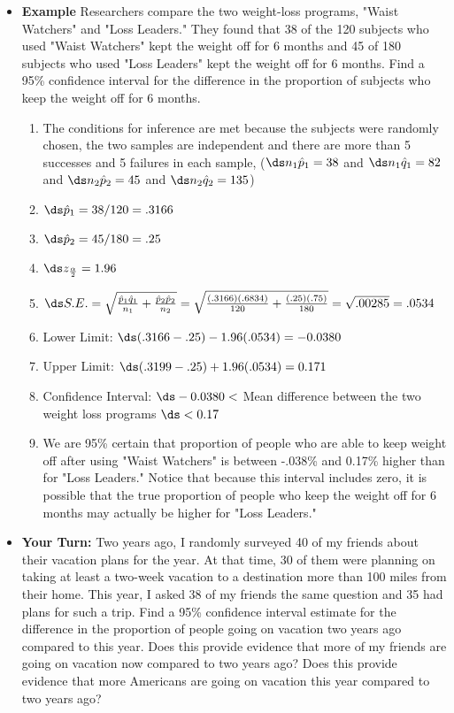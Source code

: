 \begin{itemize}
\item {\bf Example} Researchers compare the two weight-loss programs, "Waist Watchers" and "Loss Leaders."  They found that 38 of the 120 subjects who used "Waist Watchers" kept the weight off for 6 months and 45 of 180 subjects who used "Loss Leaders" kept the weight off for 6 months.  Find a 95\% confidence interval for the difference in the proportion of subjects who keep the weight off for 6 months.
\begin{enumerate}
\item The conditions for inference are met because the subjects were randomly chosen, the two samples are independent and there are more than 5 successes and 5 failures in each sample, ($\ds n_1\hat{p}_1=38$ and $\ds n_1\hat{q}_1=82$ and $\ds n_2\hat{p}_2=45$ and $\ds n_2 \hat{q}_2=135$)
\item $\ds \hat{p}_1=38/120 = .3166$
\item $\ds \hat{p}_2=45/180 = .25$
\item $\ds z_{\frac{\alpha}{2}}=1.96$
\item $\ds S.E.=\sqrt{\frac{\hat{p}_1\hat{q}_1}{n_1}+\frac{\hat{p}_2\hat{p}_2}{n_2}}=\sqrt{\frac{(.3166)(.6834)}{120}+\frac{(.25)(.75)}{180}}=\sqrt{.00285}=.0534$
\item Lower Limit:  $\ds (.3166-.25) - 1.96(.0534)=-0.0380$
\item Upper Limit: $\ds (.3199-.25) + 1.96(.0534)=0.171$
\item Confidence Interval:  $\ds -0.0380 <$ Mean difference between the two weight loss programs $\ds
 <0.17$
\item We are 95\% certain that proportion of people who are able to keep weight off after using "Waist Watchers" is between -.038\% and 0.17\% higher than for "Loss Leaders."  Notice that because this interval includes zero, it is possible that the true proportion of people who keep the weight off for 6 months may actually be higher for "Loss Leaders." 
\end{enumerate}
\item {\bf Your Turn:} Two years ago, I randomly surveyed 40 of my friends about their vacation plans for the year.  At that time, 30 of them were planning on taking at least a two-week vacation to a destination more than 100 miles from their home.  This year, I asked 38 of my friends the same question and 35 had plans for such a trip. Find a 95\% confidence interval estimate for the difference in the proportion of people going on vacation two years ago compared to this year.  Does this provide evidence that more of my friends are going on vacation now compared to two years ago? Does this provide evidence that more Americans are going on vacation this year compared to two years ago?
\end{itemize}
